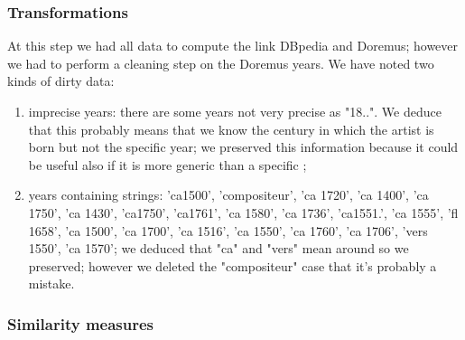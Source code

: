\documentclass[paper=a4, fontsize=11pt]{scrartcl}
\begin{document}
\subsubsection{Transformations}
At this step we had all data to compute the link DBpedia and Doremus; however we had to perform a cleaning step on the Doremus years. We have noted two kinds of dirty data:
\begin{enumerate}

\item imprecise years: there are some years not very precise as "18..". We deduce that this probably means that we know the century in which the artist is born but not the specific year; we preserved this information because it could be useful also if it is more generic than a specific ;

\item years containing strings: 'ca1500', 'compositeur', 'ca 1720', 'ca 1400', 'ca 1750', 'ca 1430', 'ca1750', 'ca1761', 'ca 1580', 'ca 1736', 'ca1551.', 'ca 1555', 'fl 1658', 'ca 1500', 'ca 1700', 'ca 1516', 'ca 1550', 'ca 1760', 'ca 1706', 'vers 1550', 'ca 1570'; we deduced that "ca" and "vers" mean around so we preserved; however we deleted the "compositeur" case that it's probably a mistake.

\end{enumerate}
\subsubsection{Similarity measures}
\end{document}
